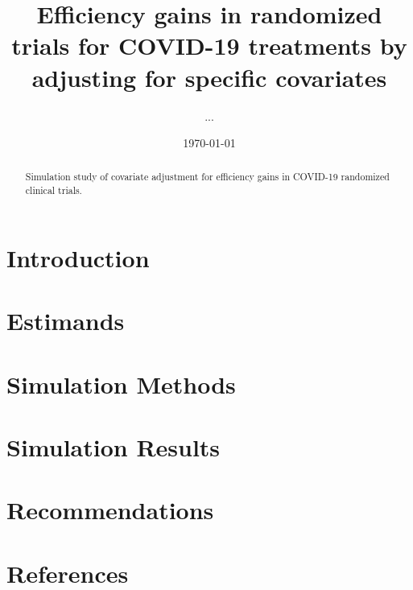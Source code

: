 \documentclass{article}
\title{
 {Efficiency gains in randomized trials for COVID-19 treatments by adjusting for specific covariates}\\
}
\author{...}
\date{\today}
\begin{document}
\maketitle

\begin{abstract}
   Simulation study of covariate adjustment for efficiency gains in COVID-19 randomized clinical trials.
\end{abstract}

\section{Introduction}

\cite[][]{covid19power}
\cite[][]{diaz2019improved}

\section{Estimands}

\section{Simulation Methods}

\section{Simulation Results}

\section{Recommendations}

\section{References}

\printbibliography
\end{document}
